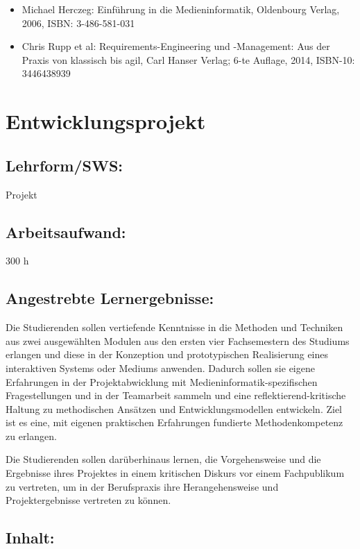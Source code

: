\begin{itemize}
\tightlist
\item
  Michael Herczeg: Einführung in die Medieninformatik, Oldenbourg
  Verlag, 2006, ISBN: 3-486-581-031
\item
  Chris Rupp et al: Requirements-Engineering und -Management: Aus der
  Praxis von klassisch bis agil, Carl Hanser Verlag; 6-te Auflage, 2014,
  ISBN-10: 3446438939
\end{itemize}

\chapter{Entwicklungsprojekt}\label{entwicklungsprojekt}

\section{Lehrform/SWS:}\label{lehrformsws-10}

Projekt

\section{Arbeitsaufwand:}\label{arbeitsaufwand-10}

300 h

\section{Angestrebte
Lernergebnisse:}\label{angestrebte-lernergebnisse-10}

Die Studierenden sollen vertiefende Kenntnisse in die Methoden und
Techniken aus zwei ausgewählten Modulen aus den ersten vier
Fachsemestern des Studiums erlangen und diese in der Konzeption und
prototypischen Realisierung eines interaktiven Systems oder Mediums
anwenden. Dadurch sollen sie eigene Erfahrungen in der Projektabwicklung
mit Medieninformatik-spezifischen Fragestellungen und in der Teamarbeit
sammeln und eine reflektierend-kritische Haltung zu methodischen
Ansätzen und Entwicklungsmodellen entwickeln. Ziel ist es eine, mit
eigenen praktischen Erfahrungen fundierte Methodenkompetenz zu erlangen.

Die Studierenden sollen darüberhinaus lernen, die Vorgehensweise und die
Ergebnisse ihres Projektes in einem kritischen Diskurs vor einem
Fachpublikum zu vertreten, um in der Berufspraxis ihre Herangehensweise
und Projektergebnisse vertreten zu können.

\section{Inhalt:}\label{inhalt-10}

